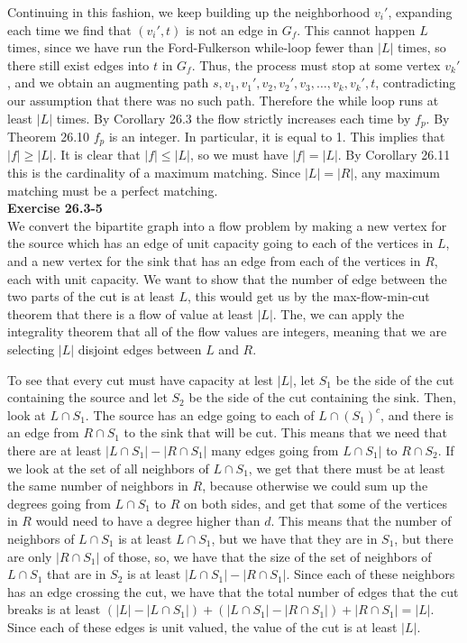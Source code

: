 \documentclass{article}
\begin{document}
Continuing in this fashion, we keep building up the neighborhood $v_i'$, expanding each time we find that $(v_i', t)$ is not an edge in $G_f$.  This cannot happen $L$ times, since we have run the Ford-Fulkerson while-loop fewer than $|L|$ times, so there still exist edges into $t$ in $G_f$. Thus, the process must stop at some vertex $v_k'$, and we obtain an augmenting path $s,v_1,v_1',v_2,v_2',v_3,\ldots, v_k,v_k',t$, contradicting our assumption that there was no such path.  Therefore the while loop runs at least $|L|$ times.  By Corollary 26.3 the flow strictly increases each time by $f_p$.  By Theorem 26.10 $f_p$ is an integer.  In particular, it is equal to 1.  This implies that $|f| \geq |L|$.  It is clear that $|f| \leq |L|$, so we must have $|f| = |L|$.  By Corollary 26.11 this is the cardinality of a maximum matching.  Since $|L| = |R|$, any maximum matching must be a perfect matching. \\

\noindent\textbf{Exercise 26.3-5}\\

We convert the bipartite graph into a flow problem by making a new vertex for the source which has an edge of unit capacity going to each of the vertices in $L$, and a new vertex for the sink that has an edge from each of the vertices in $R$, each with unit capacity. We want to show that the number of edge between the two parts of the cut is at least $L$, this would get us by the max-flow-min-cut theorem that there is a flow of value at least $|L|$. The, we can apply the integrality theorem that all of the flow values are integers, meaning that we are selecting $|L|$ disjoint edges between $L$ and $R$.

To see that every cut must have capacity at lest $|L|$, let $S_1$ be the side of the cut containing the source and let $S_2$ be the side of the cut containing the sink. Then, look at $L\cap S_1$. The source has an edge going to each of $L\cap (S_1)^c$, and there is an edge from $R\cap S_1$ to the sink that will be cut. This means that we need that there are at least $|L\cap S_1| - |R\cap S_1|$ many edges going from $L\cap S_1|$ to $R\cap S_2$. If we look at the set of all neighbors of $L\cap S_1$, we get that there must be at least the same number of neighbors in $R$, because otherwise we could sum up the degrees going from $L\cap S_1$ to $R$ on both sides, and get that some of the vertices in $R$ would need to have a degree higher than $d$. This means that the number of neighbors of $L\cap S_1$ is at least $L\cap S_1$, but we have that they are in $S_1$, but there are only $|R\cap S_1|$ of those, so, we have that the size of the set of neighbors of $L\cap S_1$ that are in $S_2$ is at least $ |L\cap S_1| - |R\cap S_1|$. Since each of these neighbors has an edge crossing the cut, we have that the total number of edges that the cut breaks is at least $(|L| - |L\cap S_1|)  + (|L\cap S_1| - |R\cap S_1|) + |R\cap S_1| = |L|$. Since each of these edges is unit valued, the value of the cut is at least $|L|$.\\
\end{document}
